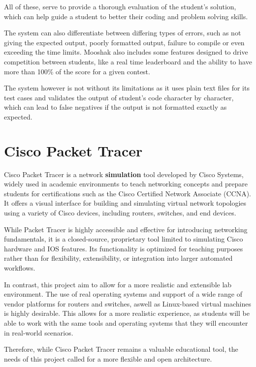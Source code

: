         All of these, serve to provide a thorough evaluation of the student's solution, which can help guide a student to better
        their coding and problem solving skills.

        The system can also differentiate between differing types of errors, such as not giving the expected output, poorly 
        formatted output, failure to compile or even exceeding the time limits.
        Mooshak also includes some features designed to drive competition between students, like a real time leaderboard and
        the ability to have more than 100\% of the score for a given contest.

        The system however is not without its limitations as it uses plain text files for its test cases and validates the output 
        of student's code character by character, which can lead to false negatives if the output is not formatted exactly as
        expected.

\section{Cisco Packet Tracer}

    Cisco Packet Tracer is a network \textbf{simulation} tool developed by Cisco Systems, widely used in academic environments 
    to teach networking concepts and prepare students for certifications such as the Cisco Certified Network Associate (CCNA). 
    It offers a visual interface for building and simulating virtual network topologies using a variety of Cisco devices, 
    including routers, switches, and end devices.

    While Packet Tracer is highly accessible and effective for introducing networking fundamentals, it is a closed-source, 
    proprietary tool limited to simulating Cisco hardware and IOS features. Its functionality is optimized for teaching 
    purposes rather than for flexibility, extensibility, or integration into larger automated workflows.

    In contrast, this project aim to allow for a more realistic and extensible lab environment. The use of real operating 
    systems and support of a wide range of vendor platforms for routers and switches, aswell as Linux-based virtual machines 
    is highly desirable. This allows for a more realistic experience, as students will be able to work with the same tools and 
    operating systems that they will encounter in real-world scenarios.

    Therefore, while Cisco Packet Tracer remains a valuable educational tool, the needs of this project called for a more 
    flexible and open architecture.